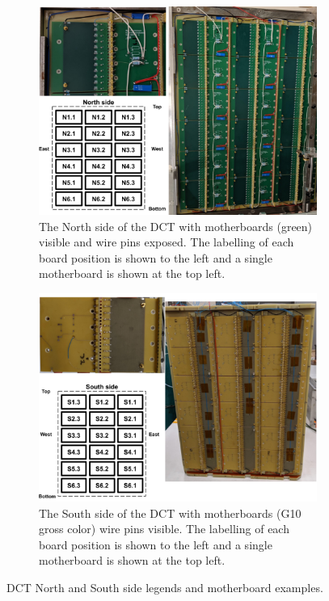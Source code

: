 \documentclass[12pt]{article}
\begin{document}
\begin{figure}
\label{fig:exp}
\begin{subfigure}{.45\textwidth}
    \centering
    \includegraphics[scale=0.2]{DCT_N_side_mb_labels.png}	\vspace{0.1in}
    \caption{The North side of the DCT with motherboards (green) visible and wire pins exposed. The labelling of each board position is shown to the left and a single motherboard is shown at the top left.}
    \label{fig:North}
\end{subfigure}\hspace{0.05\textwidth}%
\hspace*{\fill} %
\begin{subfigure}{.45\textwidth}
  \centering
  \includegraphics[scale=0.2]{DCT_S_side_mb_labels.png}
  \caption{The South side of the DCT with motherboards (G10 gross color) wire pins visible. The labelling of each board position is shown to the left and a single motherboard is shown at the top left.}
  \label{fig:South}
\end{subfigure}
\vspace{-0.1in}
\caption{DCT North and South side legends and motherboard examples.}
\end{figure}
\end{document}
